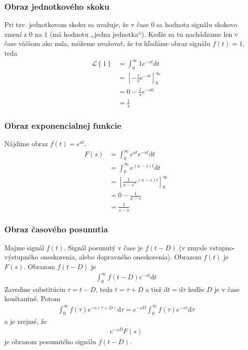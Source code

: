 \documentclass[a4paper, 10pt, ]{article}
\begin{document}
\subsubsection{Obraz jednotkového skoku}
Pri tzv. jednotkovom skoku sa uvažuje, že v čase $0$ sa hodnota signálu skokovo zmení z $0$ na $1$ (má hodnotu „jedna jednotka“). Keďže sa tu nachádzame len v čase väčšom ako nula, môžeme uvažovať, že tu hľadáme obraz signálu $f(t) = 1$, teda
\begin{equation}
    \begin{aligned}
        \mathcal L \left\{ 1 \right\} &= \int_0^\infty 1 e^{-st}\text{d}t \\
        &= \left[ - \frac{1}{s} e^{-st} \right]_0^\infty \\
        &= 0 - \frac{1}{s} e^{-s0} \\
        &= \frac{1}{s}
    \end{aligned}
\end{equation}



\subsubsection{Obraz exponencialnej funkcie}
\label{vyhlcast}

Nájdime obraz $f(t) = e^{at}$.
\begin{equation}
    \begin{aligned}
        F(s) &= \int_0^\infty e^{at} e^{-st}\text{d}t \\
        &= \int_0^\infty e^{(a-s)t}\text{d}t \\
        &= \left[ \frac{1}{a-s} e^{(a-s)t} \right]_0^\infty \\
        &= 0 - \frac{1}{a-s} \\
        &= \frac{1}{s - a}
    \end{aligned}
\end{equation}




\subsubsection{Obraz časového posunutia}

Majme signál $f(t)$. Signál posunutý v čase je $f(t-D)$ (v zmysle vstupno-výstupného oneskorenia, alebo dopravného oneskorenia). Obrazom $f(t)$ je $F(s)$. Obrazom $f(t-D)$ je
\begin{align}
    \int_0^\infty f(t-D) e^{-st} \text{d}t
\end{align}
Zaveďme substitúciu $\tau  = t-D$, teda $t=\tau+D$ a tiež $\text{d}t = \text{d}\tau$ keďže $D$ je v čase konštantné. Potom
\begin{align}
    \int_0^\infty f(\tau) e^{-s(\tau+D)} \text{d}\tau = e^{-sD} \int_0^\infty f(\tau) e^{-s\tau} \text{d}\tau
\end{align}
a je zrejmé, že
\begin{align}
    e^{-sD} F(s)
\end{align}
je obrazom posunutého signálu $f(t-D)$.
\end{document}

